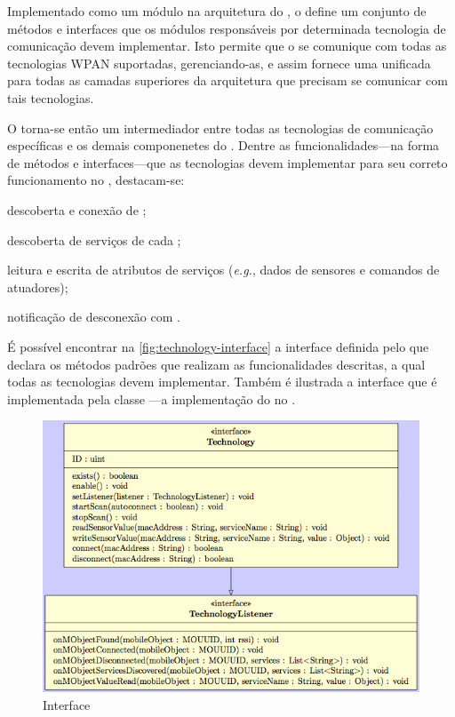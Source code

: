 Implementado como um módulo na arquitetura do \middleware, o \stwopa define um conjunto de métodos e interfaces que os módulos responsáveis por determinada tecnologia de comunicação devem implementar. Isto permite que o \stwopa se comunique com todas as tecnologias WPAN suportadas, gerenciando-as, e assim fornece uma \api unificada para todas as camadas superiores da arquitetura que precisam se comunicar com tais tecnologias.

O \stwopa torna-se então um intermediador entre todas as tecnologias de comunicação específicas e os demais componenetes do \middleware. Dentre as funcionalidades---na forma de métodos e interfaces---que as tecnologias devem implementar para seu correto funcionamento no \middleware, destacam-se:

\begin{alineas}
	\item descoberta e conexão de \smartobjs;
	
	\item descoberta de serviços de cada \smartobjs;

	\item leitura e escrita de atributos de serviços (\textit{e.g.}, dados de sensores e comandos de atuadores);

	\item notificação de desconexão com \smartobjs.
\end{alineas}

É possível encontrar na \autoref{fig:technology-interface} a interface \techinterface definida pelo \stwopa que declara os métodos padrões que realizam as funcionalidades descritas, a qual todas as tecnologias devem implementar. Também é ilustrada a interface \techlistener que é implementada pela classe \stwopaservice---a implementação do \stwopa no \mhub.

\begin{figure}[htb]
	\centering
	\caption{\label{fig:technology-interface}Interface \techinterface}
	\includegraphics[width=0.85\linewidth]{img/technology-interface.png}
\end{figure}

